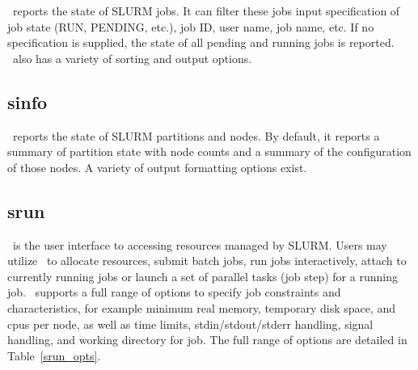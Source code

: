 \documentclass[10pt,onecolumn,times]{../common/llncs}
\begin{document}
{\squeue\ reports the state of SLURM jobs.  It can filter these
jobs input specification of job state (RUN, PENDING, etc.), job ID,
user name, job name, etc.  If no specification is supplied, the state of
all pending and running jobs is reported. 
\squeue\ also has a variety of sorting and output options.

\subsection{sinfo}

\sinfo\ reports the state of SLURM partitions and nodes.  By default,
it reports a summary of partition state with node counts and a summary
of the configuration of those nodes.  A variety of output formatting
options exist.

\subsection{srun}

\srun\ is the user interface to accessing resources managed by SLURM.
Users may utilize \srun\ to allocate resources, submit batch jobs,
run jobs interactively, attach to currently running jobs or launch a
set of parallel tasks (job step) for a running job. \srun\ supports a
full range of options to specify job constraints and characteristics,
for example minimum real memory, temporary disk space, and cpus per node,
as well as time limits, stdin/stdout/stderr handling, signal handling,
and working directory for job.  The full range of options are detailed
in Table~\ref{srun_opts}.

}
\end{document}
